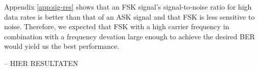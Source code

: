 \documentclass[11pt,titlepage]{report}
\begin{document}
Appendix \ref{app:sig-res} shows that an FSK signal's signal-to-noise ratio for high data rates is better than that of an ASK signal and that FSK is less sensitive to noise. Therefore, we expected that FSK with a high carrier frequency in combination with a frequency devation large enough to achieve the desired BER would yield us the best performance.

-- HIER RESULTATEN
\end{document}
